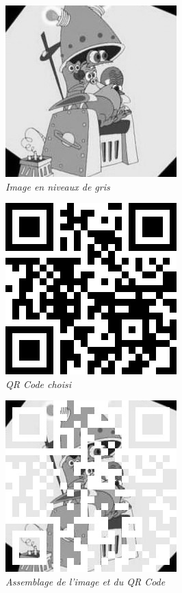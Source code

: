 \documentclass[a4paper,11pt]{article}
\begin{document}
\begin{center}
\includegraphics[scale=1]{zinzinsNB.jpg}\\
\textit{Image en niveaux de gris}
\end{center}

\begin{center}
\includegraphics[scale=1]{qrcode.jpg}\\
\textit{QR Code choisi}
\end{center}

\begin{center}
\includegraphics[scale=1]{fusion.jpg}\\
\textit{Assemblage de l'image et du QR Code}
\end{center}
\end{document}

